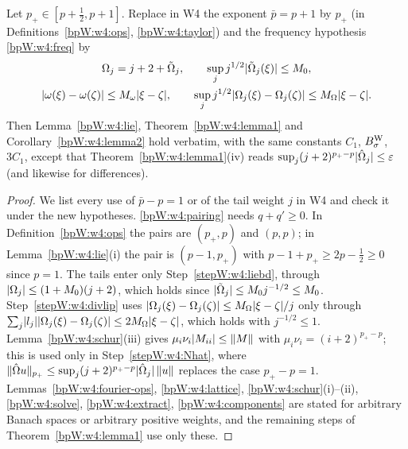 \begin{lemma}\label{bpW:w5:w4-general}
Let $p_+\in[p+\frac12,p+1]$. Replace in W4 the exponent $\bar p=p+1$ by $p_+$ (in Definitions~\ref{bpW:w4:ops},
\ref{bpW:w4:taylor}) and the frequency hypothesis \eqref{bpW:w4:freq} by
\begin{equation}\label{bpW:w5:freq}
\begin{gathered}\Omega_j=j+2+\tilde\Omega_j,\qquad\sup_jj^{1/2}\lvert \tilde\Omega_j(\xi)\rvert\le M_0,\\
\lvert \omega(\xi)-\omega(\zeta)\rvert\le M_\omega\lvert \xi-\zeta\rvert,\qquad\sup_jj^{1/2}\lvert \Omega_j(\xi)-\Omega_j(\zeta)\rvert\le M_\Omega\lvert \xi-\zeta\rvert.\end{gathered}
\end{equation}
Then Lemma~\ref{bpW:w4:lie}, Theorem~\ref{bpW:w4:lemma1} and Corollary~\ref{bpW:w4:lemma2} hold verbatim, with the
same constants $C_1$, $B^{\rm W}_\sigma$, $3C_1$, except that Theorem~\ref{bpW:w4:lemma1}(iv) reads
$\sup_j(j+2)^{p_+-p}\lvert \hat\Omega_j\rvert\le\varepsilon$ (and likewise for differences).
\end{lemma}
\begin{proof}
We list every use of $\bar p-p=1$ or of the tail weight $j$ in W4 and check it under the new hypotheses.
\label{stepW:w5:g-pair} \eqref{bpW:w4:pairing} needs $q+q'\ge0$. In Definition~\ref{bpW:w4:ops}
the pairs are $(p_+,p)$ and $(p,p)$; in Lemma~\ref{bpW:w4:lie}(i) the pair is $(p-1,p_+)$ with
$p-1+p_+\ge2p-\frac12\ge0$ since $p=1$.
\label{stepW:w5:g-tail} The tails enter only Step~\ref{stepW:w4:liebd}, through
$\lvert \Omega_j\rvert\le(1+M_0)(j+2)$, which holds since $\lvert \tilde\Omega_j\rvert\le M_0j^{-1/2}\le M_0$.
\label{stepW:w5:g-div} Step~\ref{stepW:w4:divlip} uses
$\lvert \Omega_j(\xi)-\Omega_j(\zeta)\rvert\le M_\Omega\lvert \xi-\zeta\rvert/j$ only through
$\sum_j\lvert l_j\rvert\lvert \Omega_j(\xi)-\Omega_j(\zeta)\rvert\le2M_\Omega\lvert \xi-\zeta\rvert$, which holds with $j^{-1/2}\le1$.
\label{stepW:w5:g-diag} Lemma~\ref{bpW:w4:schur}(iii) gives
$\mu_i\nu_i\lvert M_{ii}\rvert\le\lVert M\rVert$ with $\mu_i\nu_i=(i+2)^{p_+-p}$; this is used only in Step~\ref{stepW:w4:Nhat},
where $\lVert \hat\Omega u\rVert_{p_+}\le\sup_j(j+2)^{p_+-p}\lvert \hat\Omega_j\rvert\,\lVert u\rVert$ replaces the case $p_+-p=1$.
 \label{stepW:w5:g-rest} Lemmas~\ref{bpW:w4:fourier-ops}, \ref{bpW:w4:lattice},
\ref{bpW:w4:schur}(i)--(ii), \ref{bpW:w4:solve}, \ref{bpW:w4:extract}, \ref{bpW:w4:components} are stated for
arbitrary Banach spaces or arbitrary positive weights, and the remaining steps of Theorem~\ref{bpW:w4:lemma1} use
only these.
\end{proof}

